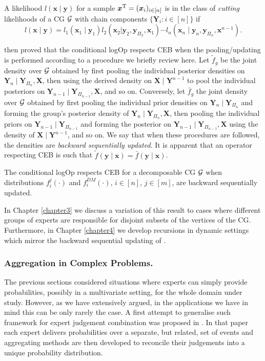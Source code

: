 \begin{definition}
\label{def:cutting}
A likelihood $l(\bm{x}\;|\;\bm{y})$ for a sample $\bm{x}^{\textnormal{T}}=(\bm{x}_i)_{i\in[n]}$ is in the class of \emph{cutting} likelihoods of a CG $\mathcal{G}$ with chain components $\{\bm{Y}_i:i\in[n]\}$ if
\begin{equation}
l(\bm{x}\;|\;\bm{y})=l_1(\bm{x}_1\;|\;\bm{y}_1)l_2(\bm{x}_2|\bm{y}_2, \bm{y}_{\Pi_2},\bm{x}_1)\cdots l_n(\bm{x}_n\;|\;\bm{y}_n,\bm{y}_{\Pi_n},\bm{x}^{n-1}).
\label{eq:cutting}
\end{equation}
\end{definition} 

\citet{Faria1997} then proved that the conditional logOp respects CEB when the pooling/updating is performed according to a procedure we briefly review here. Let $\tilde{f}_g$ be the joint density over $\mathcal{G}$ obtained by first pooling the individual posterior densities on $\bm{Y}_n\;|\; \bm{Y}_{\Pi_n}, \bm{X}$, then using the derived density on $\bm{X}\;|\; \bm{Y}^{n-1}$ to pool the  individual posteriors on $\bm{Y}_{n-1}\;|\;\bm{Y}_{\Pi_{n-1}},\bm{X}$, and so on. Conversely, let $\bar{f}_g$ the joint density over $\mathcal{G}$ obtained by first pooling the individual prior densities on $\bm{Y}_{n}\;|\;\bm{Y}_{\Pi_n}$ and forming the group's posterior density of $\bm{Y}_n\;|\;\bm{Y}_{\Pi_n},\bm{X}$, then pooling the individual priors on $\bm{Y}_{n-1}\;|\;\bm{Y}_{\Pi_{n-1}}$ and forming the posterior on $\bm{Y}_{n-1}\;|\;\bm{Y}_{\Pi_{n-1}},\bm{X}$ using the density of $\bm{X}\;|\;\bm{Y}^{n-1}$, and so on. We say that when these procedures are followed, the densities are \textit{backward sequentially updated}. It is apparent that an operator respecting CEB is such that $\tilde{f}(\bm{y}\;|\; \bm{x})=\bar{f}(\bm{y}\;|\;\bm{x})$.

\begin{proposition}
\label{prop:ceb}
The conditional logOp respects CEB for a decomposable CG $\mathcal{G}$ when distributions $f_{i}^j(\cdot)$ and $f^{DM}_i(\cdot)$, $i\in[n]$, $j\in[m]$, are backward sequentially updated.
\end{proposition}
 
 In Chapter \ref{chapter3} we discuss a variation of this result to cases where different groups of experts are responsible for disjoint subsets of the vertices of the CG. Furthermore, in Chapter \ref{chapter4} we develop recursions in dynamic settings which mirror the backward 
sequential updating of \citet{Faria1997}. 

\subsubsection{Aggregation in Complex Problems.}
The previous sections considered situations where experts can simply provide probabilities, possibly in a multivariate setting, for the whole domain under study. However, as we have extensively argued, in the applications we have in mind this can be only rarely  the case. A first attempt to generalise such framework for expert judgement combination was proposed in \citet{Bordley2009}. In that paper each expert delivers probabilities over a separate, but related, set of events and aggregating methods are then developed to reconcile their judgements into a unique probability distribution.

